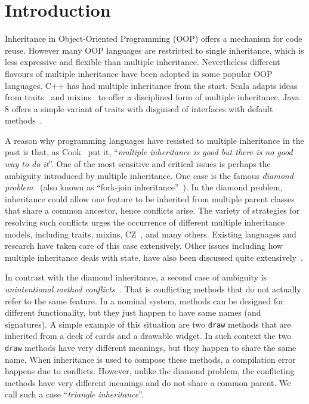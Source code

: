 \section{Introduction}
Inheritance in Object-Oriented Programming (OOP) offers a mechanism
for code reuse. However many OOP languages are restricted to single
inheritance, which is less expressive and flexible than multiple
inheritance. Nevertheless different flavours of multiple inheritance
have been adopted in some popular OOP languages. C++ has had 
multiple inheritance from the start. Scala adapts ideas from traits~\cite{scharli03traits} 
and mixins~\cite{bracha90mixin} to offer a disciplined form of multiple inheritance. Java 8 
offers a simple variant of traits with disguised of interfaces with default methods~\cite{goetz12fdefenders}.

A reason why programming languages have resisted to multiple
inheritance in the past is that, as Cook~\cite{Cook1987} put it, 
``\emph{multiple inheritance is good but there is no good way to do it}''.
One of the most sensitive and critical issues is perhaps the ambiguity
introduced by multiple inheritance. One case is the famous
\textit{diamond problem}~\cite{Sak89dis,Singh1995} (also known as ``fork-join inheritance''~\cite{Sak89dis}). 
In the diamond problem, inheritance could allow
one feature to be inherited from multiple parent classes that share a
common ancestor, hence
conflicts arise. The variety of strategies for resolving such conflicts
urges the occurrence of different multiple inheritance models,
including traits, mixins, CZ~\cite{malayeri2009cz}, and many others. Existing
languages and research have taken care of this case extensively. Other issues
including how multiple inheritance deals with state, 
have also been discussed quite extensively~\cite{classless,malayeri2009cz,stroustrup1995}.

In contrast with the diamond inheritance, a second case of ambiguity
is \textit{unintentional method conflicts}~\cite{scharli03traits}. That is conflicting 
methods that do not actually refer to the same feature. 
In a nominal system, methods can be designed for different
functionality, but they just happen to have same names (and
signatures).
A simple example of this situation are two \lstinline{draw} methods that
are inherited from a deck of cards and a drawable widget. 
In such context the two \lstinline{draw} methods have very different meanings, 
but they happen to share the same name.
When inheritance is used to compose these methods, a compilation 
error happens due to conflicts. However, unlike the diamond problem,
the conflicting methods have very different meanings and do not share a
common parent. We call such a case ``\textit{triangle inheritance}''.

